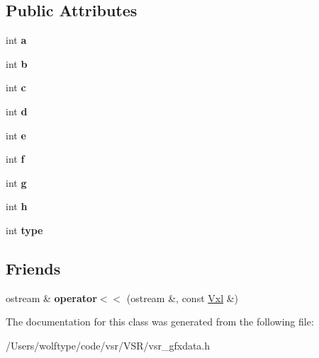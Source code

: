 \subsection*{Public Attributes}
\begin{DoxyCompactItemize}
\item 
\hypertarget{classvsr_1_1_vxl_ab833010a618eacbd3568fa366fd689ab}{int {\bfseries a}}\label{classvsr_1_1_vxl_ab833010a618eacbd3568fa366fd689ab}

\item 
\hypertarget{classvsr_1_1_vxl_a1248276d91d982aec15060820b132d94}{int {\bfseries b}}\label{classvsr_1_1_vxl_a1248276d91d982aec15060820b132d94}

\item 
\hypertarget{classvsr_1_1_vxl_ae07b5d0f226cce6b9ffd322cb0a40032}{int {\bfseries c}}\label{classvsr_1_1_vxl_ae07b5d0f226cce6b9ffd322cb0a40032}

\item 
\hypertarget{classvsr_1_1_vxl_a4df51dacd797eec30194ca3a6cb126ce}{int {\bfseries d}}\label{classvsr_1_1_vxl_a4df51dacd797eec30194ca3a6cb126ce}

\item 
\hypertarget{classvsr_1_1_vxl_a2c434b7917669d91e991a2e15583afa3}{int {\bfseries e}}\label{classvsr_1_1_vxl_a2c434b7917669d91e991a2e15583afa3}

\item 
\hypertarget{classvsr_1_1_vxl_a9d39a331a9f840ea85437b8f2f5e9085}{int {\bfseries f}}\label{classvsr_1_1_vxl_a9d39a331a9f840ea85437b8f2f5e9085}

\item 
\hypertarget{classvsr_1_1_vxl_ac31467291570d3cc15466bf0058d75c8}{int {\bfseries g}}\label{classvsr_1_1_vxl_ac31467291570d3cc15466bf0058d75c8}

\item 
\hypertarget{classvsr_1_1_vxl_a813a3e0eedf2c62e97ee3db7a1c0e9f7}{int {\bfseries h}}\label{classvsr_1_1_vxl_a813a3e0eedf2c62e97ee3db7a1c0e9f7}

\item 
\hypertarget{classvsr_1_1_vxl_a255a363692ed2b84c9cf7abf61e4c811}{int {\bfseries type}}\label{classvsr_1_1_vxl_a255a363692ed2b84c9cf7abf61e4c811}

\end{DoxyCompactItemize}
\subsection*{Friends}
\begin{DoxyCompactItemize}
\item 
\hypertarget{classvsr_1_1_vxl_ac1ed20a86641076fc75accfe5066e262}{ostream \& {\bfseries operator$<$$<$} (ostream \&, const \hyperlink{classvsr_1_1_vxl}{Vxl} \&)}\label{classvsr_1_1_vxl_ac1ed20a86641076fc75accfe5066e262}

\end{DoxyCompactItemize}


The documentation for this class was generated from the following file\-:\begin{DoxyCompactItemize}
\item 
/\-Users/wolftype/code/vsr/\-V\-S\-R/vsr\-\_\-gfxdata.\-h\end{DoxyCompactItemize}
